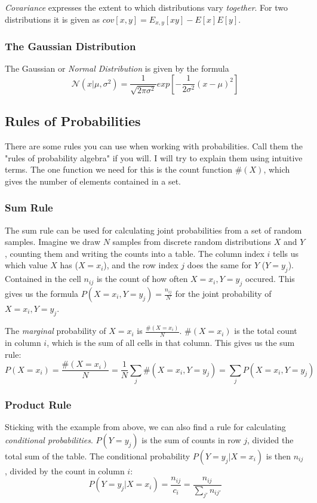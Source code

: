 \documentclass{article}
\begin{document}
\emph{Covariance} expresses the extent to which distributions vary \emph{together}.
For two distributions it is given as $cov[x,y] = E_{x,y} [xy] - E[x]E[y]$.

\subsubsection{The Gaussian Distribution}
The Gaussian or \emph{Normal Distribution} is given by the formula
\begin{equation}
	\mathcal{N}(x|\mu, \sigma^2) = \frac{1}{\sqrt{2\pi\sigma^2}} exp \left[ -\frac{1}{2\sigma^2} (x-\mu)^2 \right]
\end{equation}

\subsection{Rules of Probabilities}
There are some rules you can use when working with probabilities.
Call them the "rules of probability algebra" if you will.
I will try to explain them using intuitive terms.
The one function we need for this is the count function $\#(X)$, which gives the number of elements contained in a set.

\subsubsection{Sum Rule}
The sum rule can be used for calculating joint probabilities from a set of random samples.
Imagine we draw $N$ samples from discrete random distributions $X$ and $Y$, counting them and writing the counts into a table.
The column index $i$ tells us which value $X$ has ($X = x_i$), and the row index $j$ does the same for $Y$ ($Y = y_j$).
Contained in the cell $n_{ij}$ is the count of how often $X=x_i, Y=y_j$ occured.
This gives us the formula $P(X=x_i, Y=y_j) = \frac{n_{ij}}{N}$ for the joint probability of $X=x_i, Y=y_j$.

The \emph{marginal} probability of $X=x_i$ is $\frac{\#(X = x_i)}{N}$.
$\#(X = x_i)$ is the total count in column $i$, which is the sum of all cells in that column.
This gives us the sum rule:
\begin{equation}
	P(X = x_i) = \frac{\#(X=x_i)}{N} = \frac{1}{N} \sum_j \#(X = x_i, Y = y_j) = \sum_j P(X=x_i, Y=y_j)
\end{equation}

\subsubsection{Product Rule}
Sticking with the example from above, we can also find a rule for calculating \emph{conditional probabilities}.
$P(Y=y_j)$ is the sum of counts in row $j$, divided the total sum of the table.
The conditional probability $P(Y=y_j| X=x_i)$ is then $n_{ij}$, divided by the count in column $i$:
\begin{equation}
	P(Y=y_j|X=x_i) = \frac{n_{ij}}{c_i} = \frac{n_{ij}}{\sum_{j'} n_{ij'}}
\end{equation}
\end{document}
